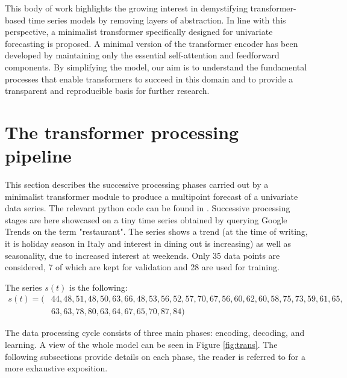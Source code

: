 \documentclass[algorithms,article,submit,pdftex,moreauthors]{Definitions/mdpi}
\begin{document}
This body of work highlights the growing interest in demystifying transformer-based time series models by removing layers of abstraction. In line with this perspective, a minimalist transformer specifically designed for univariate forecasting is proposed. A minimal version of the transformer encoder has been developed by maintaining only the essential self-attention and feedforward components. By simplifying the model, our aim is to understand the fundamental processes that enable transformers to succeed in this domain and to provide a transparent and reproducible basis for further research.


\section{The transformer processing pipeline} \label{sec:transformer}

This section describes the successive processing phases carried out by a minimalist transformer module to produce a multipoint forecast of a univariate data series. The relevant python code can be found in \cite{G25}. Successive processing stages are here showcased on a tiny time series obtained by querying Google Trends \cite{googletrends2025} on the term "restaurant". The series shows a trend (at the time of writing, it is holiday season in Italy and interest in dining out is increasing) as well as seasonality, due to increased interest at weekends. Only 35 data points are considered, 7 of which are kept for validation and 28 are used for training.

The series $s(t)$ is the following:
\begin{align}
s(t) = (& 44, 48, 51, 48, 50, 63, 66, 48, 53, 56, 52, 57, 70, 67, 56, 60, 62, 60, 58, 75, 73, 59, 61, 65,\nonumber\\
        & 63, 63, 78, 80, 63, 64, 67, 65, 70, 87, 84)\nonumber
\end{align}

The data processing cycle consists of three main phases: encoding, decoding, and learning. A view of the whole model can be seen in Figure \ref{fig:trans}. The following subsections provide details on each phase, the reader is referred to \cite{VSPU17} for a more exhaustive exposition.
\end{document}
